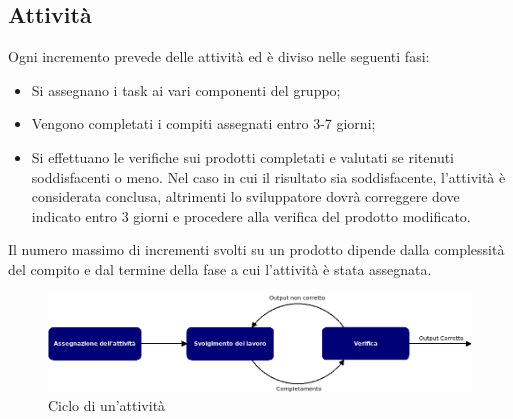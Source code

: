 \subsection{Attività}
Ogni incremento prevede delle attività ed è diviso nelle seguenti fasi:
\begin{itemize}
	\item Si assegnano i task ai vari componenti del gruppo;
	\item Vengono completati i compiti assegnati entro 3-7 giorni;
	\item Si effettuano le verifiche sui prodotti completati e valutati se ritenuti soddisfacenti o meno. Nel caso in cui il risultato sia soddisfacente, l'attività è considerata conclusa, altrimenti lo sviluppatore dovrà correggere dove indicato entro 3 giorni e procedere alla verifica del prodotto modificato.
\end{itemize}
Il numero massimo di incrementi svolti su un prodotto dipende dalla complessità del compito e dal termine della fase a cui l'attività è stata assegnata.

\begin{figure}[h]
	\centering
	\includegraphics[scale=0.45]{images/Model/activity.png}
	\caption{Ciclo di un'attività}
\end{figure}

